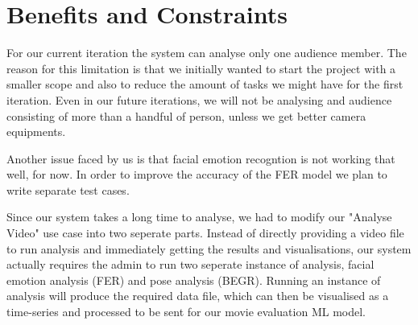 \documentclass[12pt,a4paper,man]{report}
\begin{document}
\chapter{Benefits and Constraints}
\label{sec:orgc1e6e43}
For our current iteration the system can analyse only one audience member. The reason for this limitation is that we initially wanted to start the project with a smaller scope and also to reduce the amount of tasks we might have for the first iteration. Even in our future iterations, we will not be analysing and audience consisting of more than a handful of person, unless we get better camera equipments.

Another issue faced by us is that facial emotion recogntion is not working that well, for now. In order to improve the accuracy of the \gls{FER} model we plan to write separate test cases.

Since our system takes a long time to analyse, we had to modify our "Analyse Video" use case into two seperate parts. Instead of directly providing a video file to run analysis and immediately getting the results and visualisations, our system actually requires the admin to run two seperate instance of analysis, facial emotion analysis (FER) and pose analysis (BEGR). Running an instance of analysis will produce the required data file, which can then be visualised as a time-series and processed to be sent for our movie evaluation ML model.
\end{document}
